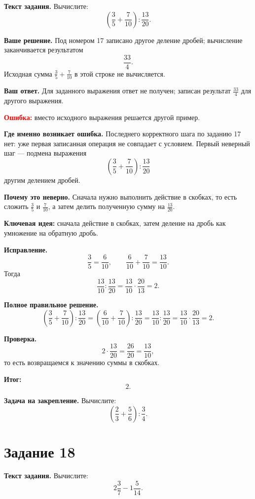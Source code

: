 \documentclass[12pt,a4paper]{article}
\begin{document}
\textbf{Текст задания.}
Вычислите:
\[
\left(\frac{3}{5}+\frac{7}{10}\right):\frac{13}{20}.
\]

\textbf{Ваше решение.}
Под номером 17 записано другое деление дробей; вычисление заканчивается результатом
\[
\frac{33}{4}.
\]
Исходная сумма $\frac35+\frac7{10}$ в этой строке не вычисляется.

\textbf{Ваш ответ.}
Для заданного выражения ответ не получен; записан результат $\frac{33}{4}$ для другого выражения.

\textcolor{red}{\textbf{Ошибка:}} вместо исходного выражения решается другой пример.

\textbf{Где именно возникает ошибка.}
Последнего корректного шага по заданию 17 нет: уже первая записанная операция не совпадает с условием.
Первый неверный шаг --- подмена выражения
\[
\left(\frac35+\frac7{10}\right):\frac{13}{20}
\]
другим делением дробей.

\textbf{Почему это неверно.}
Сначала нужно выполнить действие в скобках, то есть сложить $\frac35$ и $\frac7{10}$,
а затем делить полученную сумму на $\frac{13}{20}$.

\textcolor{blue!60!black}{\textbf{Ключевая идея:}}
сначала действие в скобках, затем деление на дробь как умножение на обратную дробь.

\textbf{Исправление.}
\[
\frac35=\frac6{10},
\qquad
\frac6{10}+\frac7{10}=\frac{13}{10}.
\]
Тогда
\[
\frac{13}{10}:\frac{13}{20}
=\frac{13}{10}\cdot\frac{20}{13}
=2.
\]

\textbf{Полное правильное решение.}
\[
\left(\frac35+\frac7{10}\right):\frac{13}{20}
=\left(\frac6{10}+\frac7{10}\right):\frac{13}{20}
=\frac{13}{10}:\frac{13}{20}
=\frac{13}{10}\cdot\frac{20}{13}
=2.
\]

\textbf{Проверка.}
\[
2\cdot\frac{13}{20}=\frac{26}{20}=\frac{13}{10},
\]
то есть возвращаемся к значению суммы в скобках.

\textcolor{teal!60!black}{\textbf{Итог:}}
\[
\boxed{2}.
\]

\textbf{Задача на закрепление.}
Вычислите:
\[
\left(\frac23+\frac56\right):\frac34.
\]

\newpage
{}
\label{task:18}
\section*{Задание 18}

\textbf{Текст задания.}
Вычислите:
\[
2\frac37-1\frac5{14}.
\]
\end{document}
